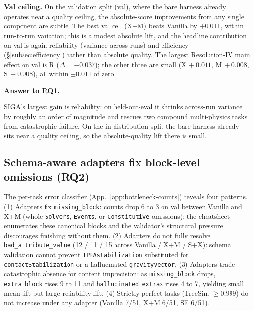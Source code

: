 \documentclass{article}
\newif\ifrqfancy
\newenvironment{rqanswer}[1]{%
  \ifrqfancy\begin{rqbox}\fi\noindent\textbf{Answer to #1.}\ %
}{%
  \ifrqfancy\end{rqbox}\else\par\smallskip\fi%
}
\begin{document}
\label{subsec:per-task}\textbf{Val ceiling.} On the validation split (val), where the bare harness already operates near a quality ceiling, the absolute-score improvements from any single component are subtle. The best val cell (X+M) beats Vanilla by $+0.011$, within run-to-run variation; this is a modest absolute lift, and the headline contribution on val is again reliability (variance across runs) and efficiency (\S\ref{subsec:efficiency}) rather than absolute quality. The largest Resolution-IV main effect on val is R ($\Delta = -0.037$); the other three are small ($\mathrm{X}\,{+}0.011$, $\mathrm{M}\,{+}0.008$, $\mathrm{S}\,{-}0.008$), all within $\pm 0.011$ of zero.

\begin{rqanswer}{RQ1}
SIGA's largest gain is reliability: on held-out-eval it shrinks across-run variance by roughly an order of magnitude and rescues two compound multi-physics tasks from catastrophic failure. On the in-distribution split the bare harness already sits near a quality ceiling, so the absolute-quality lift there is small.
\end{rqanswer}

\subsection{Schema-aware adapters fix block-level omissions (RQ2)}
\label{subsec:bottleneck-results}

The per-task error classifier (App.~\ref{app:bottleneck-counts}) reveals four patterns. (1) Adapters fix \texttt{missing\_block}: counts drop 6 to 3 on val between Vanilla and X+M (whole \texttt{Solvers}, \texttt{Events}, or \texttt{Constitutive} omissions); the cheatsheet enumerates these canonical blocks and the validator's structural pressure discourages finishing without them. (2) Adapters do not fully resolve \texttt{bad\_attribute\_value} (12 / 11 / 15 across Vanilla / X+M / S+X): schema validation cannot prevent \texttt{TPFAstabilization} substituted for \texttt{contactStabilization} or a hallucinated \texttt{gravityVector}. (3) Adapters trade catastrophic absence for content imprecision: as \texttt{missing\_block} drops, \texttt{extra\_block} rises 9 to 11 and \texttt{hallucinated\_extras} rises 4 to 7, yielding small mean lift but large reliability lift. (4) Strictly perfect tasks (TreeSim $\geq 0.999$) do not increase under any adapter (Vanilla 7/51, X+M 6/51, SE 6/51).
\end{document}
